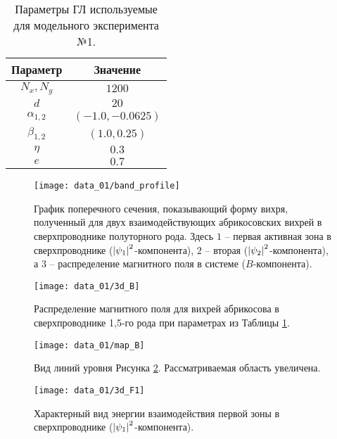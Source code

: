 \begin{table}[h!]
    \centering
    \begin{tabular}{|c|c|}
        \hline 
        Параметр           & Значение              \\ \hline
        \( N_x, N_y \)     & \( 1200 \)            \\ \hline
        \( d \)            & \( 20 \)              \\ \hline
        \( \alpha_{1,2} \) & \( (-1.0, -0.0625) \) \\ \hline
        \( \beta_{1,2} \)  & \( (1.0, 0.25) \)     \\ \hline
        \( \eta \)         & \( 0.3 \)             \\ \hline
        \( e \)            & \( 0.7 \)             \\ \hline
    \end{tabular}
    \caption{Параметры ГЛ используемые для модельного эксперимента №1.}
    \label{param:01}
\end{table}

\begin{figure}[h!]
    \center
    \texttt{[image: data\_01/band\_profile]}
    \caption{График поперечного сечения, показывающий форму вихря, полученный 
        для двух взаимодействующих абрикосовских вихрей в сверхпроводнике 
        полуторного рода. Здесь \( 1 \) -- первая активная зона в 
        сверхпроводнике (\( \left| \psi_1 \right|^2 \)-компонента), \( 2 \) -- вторая 
        (\( \left| \psi_2 \right|^2 \)-компонента), а \( 3 \) -- распределение 
        магнитного поля в системе (\( B \)-компонента).}
    \label{img:band-profile-01}
\end{figure}

\begin{figure}[h!]
    \center
    \texttt{[image: data\_01/3d\_B]}
    \caption{Распределение магнитного поля для вихрей абрикосова в 
        сверхпроводнике 1,5-го рода при параметрах из Таблицы \ref{param:01}.}
    \label{img:3d-field-B-01}
\end{figure}

\begin{figure}[h!]
    \center
    \texttt{[image: data\_01/map\_B]}
    \caption{Вид линий уровня Рисунка \ref{img:3d-field-B-01}. 
        Рассматриваемая область увеличена.}
    \label{img:map-field-B-01}
\end{figure}

\begin{figure}[h!]
    \center
    \texttt{[image: data\_01/3d\_F1]}
    \caption{Характерный вид энергии взаимодействия первой зоны в 
        сверхпроводнике (\( \left| \psi_1 \right|^2 \)-компонента).}
    \label{img:3d-band-1-01}
\end{figure}

